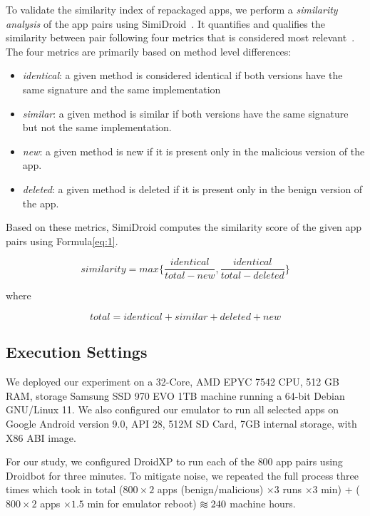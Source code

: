 To validate the similarity index of repackaged apps, we perform a \textit{similarity analysis} of the app pairs using SimiDroid~\cite{DBLP:conf/trustcom/0029BK17}. It quantifies and qualifies the similarity between pair following four metrics that is considered most relevant~\cite{DBLP:conf/wcre/0029BKT16}. The four metrics are primarily based on method level differences:

\begin{itemize}
    \item \textit{identical}: a given method is considered identical if both versions have the same signature and the same implementation
    \item \textit{similar}: a given method is similar if both versions have the same signature but not the same implementation.
    \item \textit{new}: a given method is new if it is present only in the malicious version of the app.
    \item \textit{deleted}: a given method is deleted if it is present only in the benign version of the app.
\end{itemize}

Based on these metrics, SimiDroid computes the similarity score of the given app pairs using Formula\eqref{eq:1}.

\begin{equation}
 similarity = max \lbrace\frac{identical}{total-new},\frac{identical}{total-deleted}\rbrace  \label{eq:1}
\end{equation}

where

\begin{equation}
 total = identical + similar + deleted + new\label{eq:2}
\end{equation}
\newline


\subsection{Execution Settings}\label{sec:hardware}

We deployed our experiment on a 32-Core, AMD EPYC 7542 CPU, 512 GB RAM, storage Samsung SSD 970 EVO 1TB machine running a 64-bit Debian  GNU/Linux 11. We also configured our emulator to run all selected apps on Google Android version 9.0, API 28, 512M SD Card, 7GB internal storage, with X86 ABI image.

For our study, we configured DroidXP to run each of the $800$ app pairs using Droidbot for three minutes. To mitigate noise, we repeated the full process three times which took in total ($800 \times 2$ apps (benign/malicious) $\times 3$ runs $\times 3$ min) + ($800 \times 2$ apps $\times 1.5$ min for emulator reboot) $\apeq 240$ machine hours.

